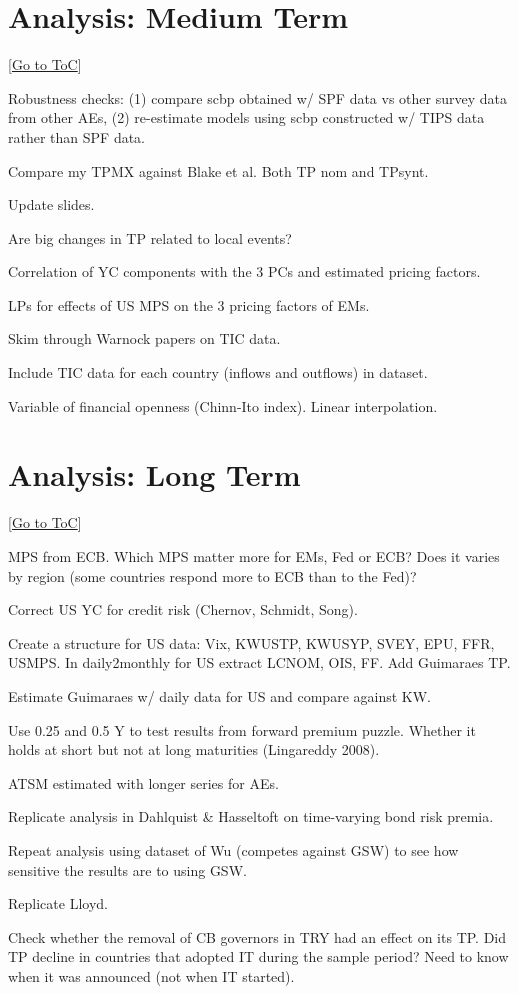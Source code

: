 \documentclass[12pt]{article}
\newcommand{\gototoc}{\vspace{-1.8cm} \null\hfill [\hyperlink{toc}{Go to ToC}] \newline}
\begin{document}
\section{Analysis: Medium Term}
\gototoc
\begin{todolist}
	\item Robustness checks: (1) compare scbp obtained w/ SPF data vs other survey data from other AEs, (2) re-estimate models using scbp constructed w/ TIPS data rather than SPF data.
	\item Compare my TPMX against Blake et al. Both TP nom and TPsynt.
	\item Update slides.
	\item Are big changes in TP related to local events?
	\item Correlation of YC components with the 3 PCs and estimated pricing factors.
	\item LPs for effects of US MPS on the 3 pricing factors of EMs.
	\item Skim through Warnock papers on TIC data.
	\item Include TIC data for each country (inflows and outflows) in dataset.
	\item Variable of financial openness (Chinn-Ito index). Linear interpolation.
\end{todolist}

\section{Analysis: Long Term}
\gototoc
\begin{todolist}
	\item MPS from ECB. Which MPS matter more for EMs, Fed or ECB? Does it varies by region (some countries respond more to ECB than to the Fed)?
	\item Correct US YC for credit risk (Chernov, Schmidt, Song).
	\item Create a structure for US data: Vix, KWUSTP, KWUSYP, SVEY, EPU, FFR, USMPS. In daily2monthly for US extract LCNOM, OIS, FF. Add Guimaraes TP.
	\item Estimate Guimaraes w/ daily data for US and compare against KW.
	\item Use 0.25 and 0.5 Y to test results from forward premium puzzle. Whether it holds at short but not at long maturities (Lingareddy 2008).
	\item ATSM estimated with longer series for AEs.
	\item Replicate analysis in Dahlquist \& Hasseltoft on time-varying bond risk premia.
	\item Repeat analysis using dataset of Wu (competes against GSW) to see how sensitive the results are to using GSW.
	\item Replicate Lloyd.
	\item Check whether the removal of CB governors in TRY had an effect on its TP. Did TP decline in countries that adopted IT during the sample period? Need to know when it was announced (not when IT started).
\end{todolist}
\end{document}
